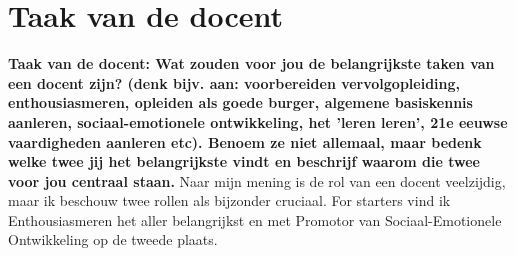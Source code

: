 \documentclass{article}
\begin{document}
    \newpage
    

    \section{Taak van de docent}
        \textbf{Taak van de docent: Wat zouden voor jou de belangrijkste taken van een docent zijn? (denk bijv. aan: voorbereiden vervolgopleiding, enthousiasmeren, opleiden als goede burger, algemene basiskennis aanleren, sociaal-emotionele ontwikkeling, het 'leren leren', 21e eeuwse vaardigheden aanleren etc). Benoem ze niet allemaal, maar bedenk welke twee jij het belangrijkste vindt en beschrijf waarom die twee voor jou centraal staan.}
        \bigskip
        \noindent Naar mijn mening is de rol van een docent veelzijdig, maar ik beschouw twee rollen als bijzonder cruciaal. For starters vind ik Enthousiasmeren het aller belangrijkst en met Promotor van Sociaal-Emotionele Ontwikkeling op de tweede plaats.
        
\end{document}
